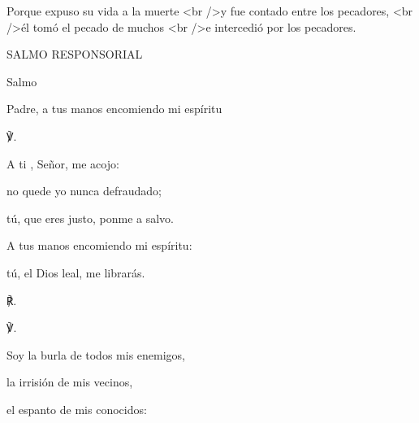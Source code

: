 			\begin{readtalk}Porque expuso su vida a la muerte <br />y fue contado entre los pecadores, <br />él tomó el pecado de muchos <br />e intercedió por los pecadores.\end{readtalk}
			
			\begin{readtitle}SALMO RESPONSORIAL\end{readtitle}
			
			\begin{readbook}Salmo \end{readbook}
			
			\begin{readtheme}Padre, a tus manos encomiendo mi espíritu\end{readtheme}
			
			\begin{readps}\begin{readred}℣.\end{readred} A ti , Señor, me acojo: \end{readps}
			
			\begin{readtabbed}no quede yo nunca defraudado; \end{readtabbed}
			
			\begin{readtabbed}tú, que eres justo, ponme a salvo. \end{readtabbed}
			
			\begin{readtabbed}A tus manos encomiendo mi espíritu: \end{readtabbed}
			
			\begin{readtabbed}tú, el Dios leal, me librarás. \begin{readred}℟.\end{readred}\end{readtabbed}
			
			\begin{readps}\begin{readred}℣.\end{readred} Soy la burla de todos mis enemigos, \end{readps}
			
			\begin{readtabbed}la irrisión de mis vecinos, \end{readtabbed}
			
			\begin{readtabbed}el espanto de mis conocidos: \end{readtabbed}
			
